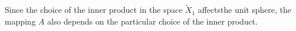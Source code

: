 \begin{remark}\label{chap4-rem6.3}
Since the choice of the inner product in the space $\widetilde{X}_{1}$
affects\pageoriginale the unit sphere, the mapping $A$ also depends on
the particular choice of the inner product.
\end{remark}

